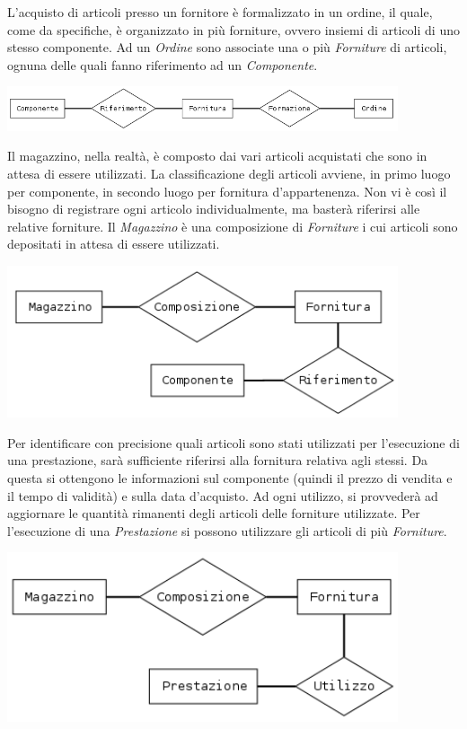 		L'acquisto di articoli presso un fornitore è formalizzato in un ordine, il quale, come da specifiche, è organizzato in più forniture, ovvero insiemi di articoli di uno stesso componente.
		Ad un \emph{Ordine} sono associate una o più \emph{Forniture} di articoli, ognuna delle quali fanno riferimento ad un \emph{Componente}.
		
		\includegraphics[width=11.5cm]{images/diagrams/componente_ordine.png}
		
		Il magazzino, nella realtà, è composto dai vari articoli acquistati che sono in attesa di essere utilizzati. La classificazione degli articoli avviene, in primo luogo per componente, in secondo luogo per fornitura d'appartenenza. Non vi è così il bisogno di registrare ogni articolo individualmente, ma basterà riferirsi alle relative forniture.
		Il \emph{Magazzino} è una composizione di \emph{Forniture} i cui articoli sono depositati in attesa di essere utilizzati.
		
		\includegraphics[width=11.5cm]{images/diagrams/magazzino_fornitura.png}
		
		Per identificare con precisione quali articoli sono stati utilizzati per l'esecuzione di una prestazione, sarà sufficiente riferirsi alla fornitura relativa agli stessi. Da questa si ottengono le informazioni sul componente (quindi il prezzo di vendita e il tempo di validità) e sulla data d'acquisto.
		Ad ogni utilizzo, si provvederà ad aggiornare le quantità rimanenti degli articoli delle forniture utilizzate.
		Per l'esecuzione di una \emph{Prestazione} si possono utilizzare gli articoli di più \emph{Forniture}.
		
		\includegraphics[width=11.5cm]{images/diagrams/prestazione_fornitura.png}
		
